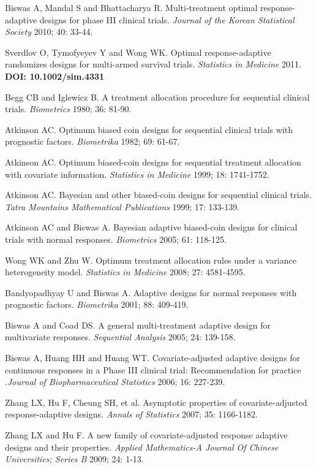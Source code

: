 \begin{thebibliography}
 Biswas A, Mandal S and Bhattacharya R. Multi-treatment optimal response-adaptive designs for phase III clinical trials. \textit{Journal of the Korean Statistical Society} 2010; 40: 33-44.

 Sverdlov O, Tymofyeyev Y and Wong WK. Optimal response-adaptive randomizes designs for multi-armed survival trials.  \textit{Statistics in Medicine} 2011. \textbf{DOI: 10.1002/sim.4331}

 Begg CB and Iglewicz B. A treatment allocation
procedure for sequential clinical trials. \textit{Biometrics} 1980; 36: 81-90.

 Atkinson AC. Optimum biased coin designs for sequential clinical trials with prognostic factors. \textit{Biometrika} 1982; 69: 61-67.

 Atkinson AC.  Optimum biased-coin designs for sequential treatment allocation with covariate information. \textit{Statistics in Medicine}  1999; 18: 1741-1752.

 Atkinson AC. Bayesian and other biased-coin designs for sequential clinical trials. \textit{Tatra Mountains Mathematical Publications}  1999; 17: 133-139.

 Atkinson AC and Biswas A. Bayesian adaptive biased-coin designs for clinical trials with normal responses. \textit{Biometrics}  2005; 61:  118-125.

 Wong WK and Zhu W. Optimum treatment allocation rules under a variance heterogeneity model. \textit{Statistics in Medicine}  2008; 27: 4581-4595.

  Bandyopadhyay U and Biswas A. Adaptive designs for normal responses with prognostic factors. \textit{Biometrika} 2001; 88:
409-419.

 Biswas A and Coad DS. A general multi-treatment adaptive design for multivariate responses.  \textit{Sequential Analysis} 2005; 24: 139-158.
 
  Biswas A, Huang HH and Huang WT. Covariate-adjusted adaptive designs for continuous responses in a Phase III clinical trial:
Recommendation for practice .\textit{Journal of Biopharmaceutical
Statistics} 2006; 16: 227-239.

 Zhang LX, Hu F,  Cheung SH, et al. Asymptotic properties of covariate-adjusted response-adaptive designs.  \textit{Annals of Statistics} 2007; 35: 1166-1182.

 Zhang LX and Hu F.  A new family of covariate-adjusted response adaptive designs and their properties. \textit{Applied Mathematics-A Journal Of Chinese Universities; Series B} 2009; 24: 1-13.


\end{thebibliography}
